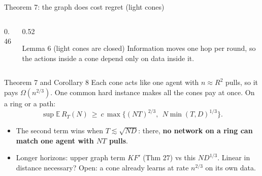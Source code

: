 \documentclass[11pt]{beamer}
\begin{document}
\begin{frame}{Theorem 7: the graph does cost regret (light cones)}
\scriptsize
\begin{columns}[c]
\begin{column}{0.46\textwidth}
\centering
{}
\end{column}
\begin{column}{0.52\textwidth}
\begin{block}{Lemma 6 (light cones are closed)}
Information moves one hop per round, so the actions inside a cone depend only on data inside it.
\end{block}
\end{column}
\end{columns}
\begin{block}{Theorem 7 and Corollary 8}
Each cone acts like one agent with $n\approx R^2$ pulls, so it pays $\Omega(n^{2/3})$. One common hard instance makes all the cones pay at once. On a ring or a path:
\[
\sup\mathbb E\,R_T(N)\ \ge\ c\,\max\Big\{(NT)^{2/3},\ \ N\min(T,D)^{1/3}\Big\}.
\]
\end{block}
\begin{itemize}
\item The second term wins when $T\lesssim\sqrt{ND}$: there, \textbf{no network on a ring can match one agent with $NT$ pulls}.
\item Longer horizons: upper graph term $KF'$ (Thm 27) vs this $ND^{1/3}$. Linear in distance necessary? \alert{Open}: a cone already learns at rate $n^{2/3}$ on its own data.
\end{itemize}
\end{frame}
\end{document}
